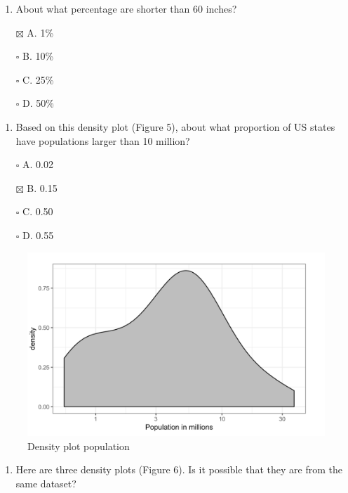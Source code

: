\documentclass[
]{article}
\providecommand{\tightlist}{%
  \setlength{\itemsep}{0pt}\setlength{\parskip}{0pt}}
\begin{document}
\begin{enumerate}
\def\labelenumi{\arabic{enumi}.}
\setcounter{enumi}{7}
\tightlist
\item
  About what percentage are shorter than 60 inches?
\end{enumerate}

\begin{itemize}
\tightlist
\item[$\boxtimes$]
  A. 1\%
\item[$\square$]
  B. 10\%
\item[$\square$]
  C. 25\%
\item[$\square$]
  D. 50\%
\end{itemize}

\begin{enumerate}
\def\labelenumi{\arabic{enumi}.}
\setcounter{enumi}{8}
\tightlist
\item
  Based on this density plot (Figure 5), about what proportion of US
  states have populations larger than 10 million?
\end{enumerate}

\begin{itemize}
\tightlist
\item[$\square$]
  A. 0.02
\item[$\boxtimes$]
  B. 0.15
\item[$\square$]
  C. 0.50
\item[$\square$]
  D. 0.55
\end{itemize}

\begin{figure}
\centering
\includegraphics{images/Density plot population.png}
\caption{Density plot population}
\end{figure}

\begin{enumerate}
\def\labelenumi{\arabic{enumi}.}
\setcounter{enumi}{9}
\tightlist
\item
  Here are three density plots (Figure 6). Is it possible that they are
  from the same dataset?
\end{enumerate}
\end{document}
